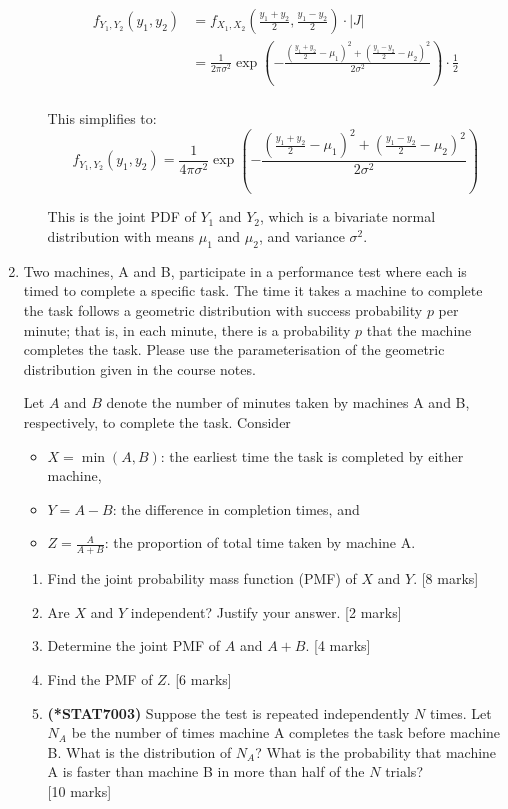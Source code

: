 \documentclass[12pt]{article}
\begin{document}
\begin{enumerate}
\begin{enumerate}
\begin{align*}
f_{Y_1, Y_2}(y_1, y_2) &= f_{X_1, X_2}\left(\frac{y_1 + y_2}{2}, \frac{y_1 - y_2}{2}\right) \cdot \left|J\right| \\
&= \frac{1}{2\pi \sigma^2} \exp\left(-\frac{\left(\frac{y_1 + y_2}{2} - \mu_1\right)^2 + \left(\frac{y_1 - y_2}{2} - \mu_2\right)^2}{2\sigma^2}\right) \cdot \frac{1}{2} \\
\end{align*}

This simplifies to:
\[
\boxed{f_{Y_1, Y_2}(y_1, y_2) = \frac{1}{4\pi \sigma^2} \exp\left(-\frac{\left(\frac{y_1 + y_2}{2} - \mu_1\right)^2 + \left(\frac{y_1 - y_2}{2} - \mu_2\right)^2}{2\sigma^2}\right)}
\]

This is the joint PDF of $Y_1$ and $Y_2$, which is a bivariate normal distribution with means $\mu_1$ and $\mu_2$, and variance $\sigma^2$.
%

\end{enumerate}

\vspace{5pt}
\item 
Two machines, A and B, participate in a performance test where each is timed to complete a specific task. The time it takes a machine to complete the task follows a geometric distribution with success probability $p$ per minute; that is, in each minute, there is a probability $p$ that the machine completes the task. Please use the parameterisation of the geometric distribution given in the course notes.  

Let $A$ and $B$ denote the number of minutes taken by machines A and B, respectively, to complete the task. Consider
\begin{itemize}
\item $X=\min(A, B)$: the earliest time the task is completed by either machine,
\item $Y = A-B$: the difference in completion times, and 
\item $Z = \frac{A}{A+B}$: the proportion of total time taken by machine A.
\end{itemize}
 
\begin{enumerate}
\item Find the joint probability mass function (PMF) of $X$ and $Y$. 
			\hfill [8 marks]
%
\item Are $X$ and $Y$ independent? Justify your answer.  
			\hfill [2 marks]
%
\item Determine the joint PMF of $A$ and $A+B$. 
			\hfill [4 marks]
%
\item Find the PMF of $Z$.  
			\hfill [6 marks]
%
\item{\bf (*STAT7003)} 
Suppose the test is repeated independently $N$ times. Let $N_A$ be the number of times machine A completes the task before machine B. What is the distribution of $N_A$? What is the probability that machine A is faster than machine B in more than half of the $N$ trials?
			\\\phantom{1}\hfill [10 marks]
\end{enumerate}


\end{enumerate}
\end{document}
